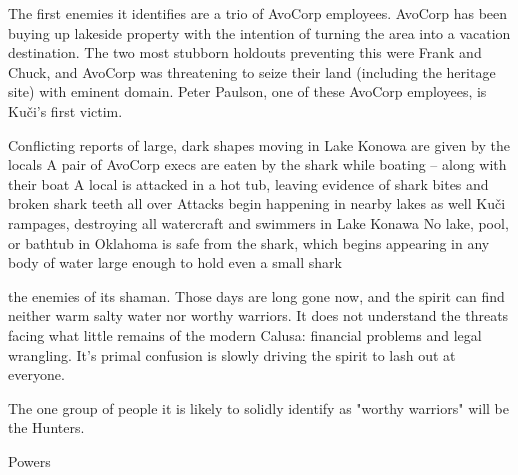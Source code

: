 \documentclass{motw}
\begin{document}
The first enemies it identifies are a trio of AvoCorp employees.  AvoCorp has been buying up lakeside property with the intention of turning the area into a vacation destination.  The two most stubborn holdouts preventing this were Frank and Chuck, and AvoCorp was threatening to seize their land (including the heritage site) with eminent domain. Peter Paulson, one of these AvoCorp employees, is Kuči's first victim.

\Countdown%
{Conflicting reports of large, dark shapes moving in Lake Konowa are given by the locals}
{A pair of AvoCorp execs are eaten by the shark while boating -- along with their boat}
{A local is attacked in a hot tub, leaving evidence of shark bites and broken shark teeth all over}
{Attacks begin happening in nearby lakes as well}
{Kuči rampages, destroying all watercraft and swimmers in Lake Konawa}
{No lake, pool, or bathtub in Oklahoma is safe from the shark, which begins appearing in any body of water large enough to hold even a small shark}


 the enemies of its shaman.  Those days are long gone now, and the spirit can find neither warm salty water nor worthy warriors.  It does not understand the threats facing what little remains of the modern Calusa: financial problems and legal wrangling.  It's primal confusion is slowly driving the spirit to lash out at everyone.

The one group of people it is likely to solidly identify as "worthy warriors" will be the Hunters.


\begin{mStatList}{Powers}
\end{mStatList}
\end{document}
